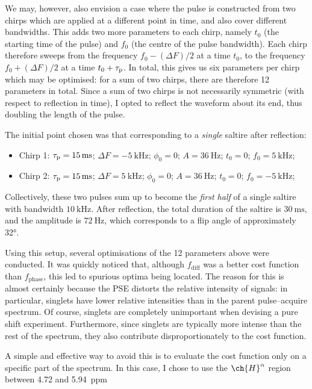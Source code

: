 We may, however, also envision a case where the pulse is constructed from two chirps which are applied at a different point in time, and also cover different bandwidths.
This adds two more parameters to each chirp, namely $t_0$ (the starting time of the pulse) and $f_0$ (the centre of the pulse bandwidth).
Each chirp therefore sweeps from the frequency $f_0 - (\Delta F)/2$ at a time $t_0$, to the frequency $f_0 + (\Delta F)/2$ at a time $t_0 + \tau_\mathrm{p}$.
In total, this gives us six parameters per chirp which may be optimised: for a sum of two chirps, there are therefore 12 parameters in total.
Since a sum of two chirps is not necessarily symmetric (with respect to reflection in time), I opted to reflect the waveform about its end, thus doubling the length of the pulse.

The initial point chosen was that corresponding to a \textit{single} saltire after reflection:
\begin{itemize}
    \item Chirp 1: $\taup = \SI{15}{\ms}$; $\Delta F = \SI{-5}{\kHz}$; $\phi_0 = 0$; $A = \SI{36}{\Hz}$; $t_0 = 0$; $f_0 = \SI{5}{\kHz}$;
    \item Chirp 2: $\taup = \SI{15}{\ms}$; $\Delta F = \SI{5}{\kHz}$; $\phi_0 = 0$; $A = \SI{36}{\Hz}$; $t_0 = 0$; $f_0 = \SI{-5}{\kHz}$;
\end{itemize}
Collectively, these two pulses sum up to become the \textit{first half} of a single saltire with bandwidth $\SI{10}{\kHz}$.
After reflection, the total duration of the saltire is $\SI{30}{\ms}$, and the amplitude is $\SI{72}{\Hz}$, which corresponds to a flip angle of approximately \ang{32}.

Using this setup, several optimisations of the 12 parameters above were conducted.
It was quickly noticed that, although $f_\text{diff}$ was a better cost function than $f_\text{phase}$, this led to spurious optima being located.
The reason for this is almost certainly because the PSE distorts the relative intensity of signals: in particular, singlets have lower relative intensities than in the parent pulse--acquire spectrum.
Of course, singlets are completely unimportant when devising a pure shift experiment.
Furthermore, since singlets are typically more intense than the rest of the spectrum, they also contribute disproportionately to the cost function.

A simple and effective way to avoid this is to evaluate the cost function only on a specific part of the spectrum.
In this case, I chose to use the $\ch{H}^{\alpha}$ region between 4.72 and \SI{5.94}{ppm}

